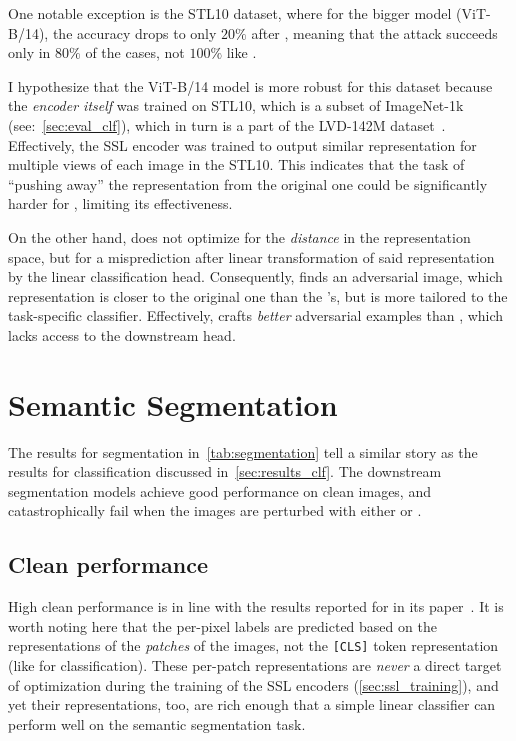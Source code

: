 One notable exception is the STL10 dataset, where for the bigger \DINOvtwo model (ViT-B/14), the accuracy drops to only $20\%$ after \EmbedAttack, meaning that the attack succeeds only in $80\%$ of the cases, not $100\%$ like \PGD. 

I hypothesize that the \DINOvtwo ViT-B/14 model is more robust for this dataset because the \textit{encoder itself} was trained on STL10, which is a subset of ImageNet-1k (see:~\cref{sec:eval_clf}), which in turn is a part of the LVD-142M dataset~\cite{dinov2}. Effectively, the SSL encoder was trained to output similar representation for multiple views of each image in the STL10. This indicates that the task of ``pushing away'' the representation from the original one could be significantly harder for \EmbedAttack, limiting its effectiveness.

On the other hand, \PGD does not optimize for the \textit{distance} in the representation space, but for a misprediction after linear transformation of said representation by the linear classification head. Consequently, \PGD finds an adversarial image, which representation is closer to the original one than the \EmbedAttack's, but is more tailored to the task-specific classifier. Effectively, \PGD crafts \textit{better} adversarial examples than \EmbedAttack, which lacks access to the downstream head.

\section{Semantic Segmentation}\label{sec:results_seg}

The results for segmentation in~\cref{tab:segmentation} tell a similar story as the results for classification discussed in~\cref{sec:results_clf}. The downstream segmentation models achieve good performance on clean images, and catastrophically fail when the images are perturbed with either \EmbedAttack or \SegPGD.



\subsection{Clean performance}

High clean performance is in line with the results reported for \DINOvtwo in its paper~\cite{dinov2}. It is worth noting here that the per-pixel labels are predicted based on the representations of the \textit{patches} of the images, not the \texttt{[CLS]} token representation (like for classification). These per-patch representations are \textit{never} a direct target of optimization during the training of the SSL encoders (\cref{sec:ssl_training}), and yet their representations, too, are rich enough that a simple linear classifier can perform well on the semantic segmentation task.

